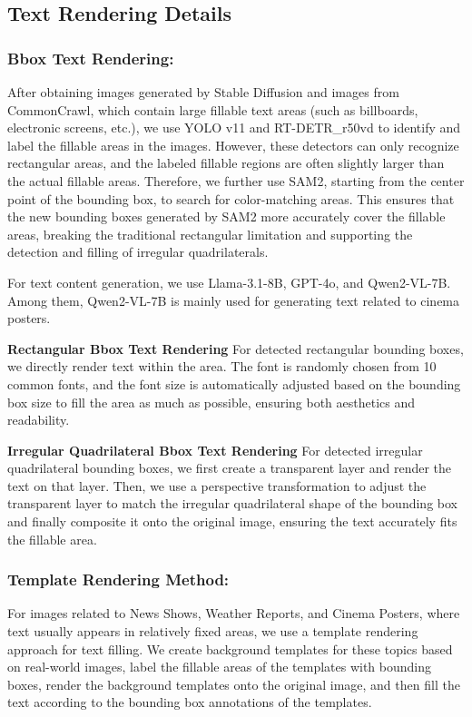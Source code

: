 \subsection{Text Rendering Details}

\subsubsection{Bbox Text Rendering:}
After obtaining images generated by Stable Diffusion and images from CommonCrawl, which contain large fillable text areas (such as billboards, electronic screens, etc.), we use YOLO v11 and RT-DETR\_r50vd to identify and label the fillable areas in the images. However, these detectors can only recognize rectangular areas, and the labeled fillable regions are often slightly larger than the actual fillable areas. 
Therefore, we further use SAM2, starting from the center point of the bounding box, to search for color-matching areas. This ensures that the new bounding boxes generated by SAM2 more accurately cover the fillable areas, breaking the traditional rectangular limitation and supporting the detection and filling of irregular quadrilaterals.

For text content generation, we use Llama-3.1-8B, GPT-4o, and Qwen2-VL-7B. 
Among them, Qwen2-VL-7B is mainly used for generating text related to cinema posters.

\textbf{Rectangular Bbox Text Rendering}
For detected rectangular bounding boxes, we directly render text within the area. 
The font is randomly chosen from 10 common fonts, and the font size is automatically adjusted based on the bounding box size to fill the area as much as possible, ensuring both aesthetics and readability.

\textbf{Irregular Quadrilateral Bbox Text Rendering}
For detected irregular quadrilateral bounding boxes, we first create a transparent layer and render the text on that layer. Then, we use a perspective transformation to adjust the transparent layer to match the irregular quadrilateral shape of the bounding box and finally composite it onto the original image, ensuring the text accurately fits the fillable area.

\subsubsection{Template Rendering Method: }
For images related to News Shows, Weather Reports, and Cinema Posters, where text usually appears in relatively fixed areas, we use a template rendering approach for text filling. We create background templates for these topics based on real-world images, label the fillable areas of the templates with bounding boxes, render the background templates onto the original image, and then fill the text according to the bounding box annotations of the templates.



